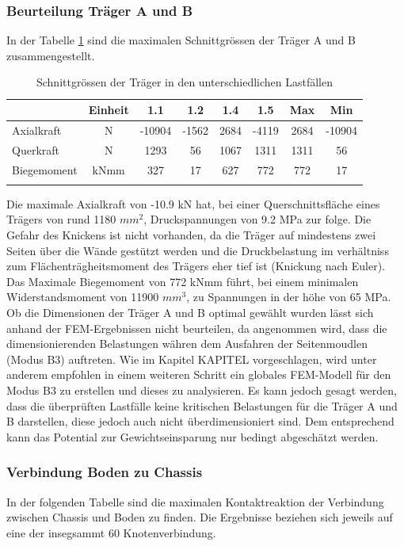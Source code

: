 \subsubsection{Beurteilung Träger A und B}
In der Tabelle \ref{tab:FEMres Träger} sind die maximalen Schnittgrössen der Träger A und B zusammengestellt.
\begin{table}[H]
\centering
\begin{tabular}{lccccccc}
\thickhline
&	Einheit	&	1.1	&	1.2	&	1.4	&	1.5	&	Max	&	Min	\\	\hline
Axialkraft	&	N	&	-10904	&	-1562	&	2684	&	-4119	&	2684	&	-10904	\\
Querkraft	&	N	&	1293	&	56	&	1067	&	1311	&	1311	&	56	\\
Biegemoment	&	kNmm	&	327	&	17	&	627	&	772	&	772	&	17	\\	\thickhline
\end{tabular}
\caption{Schnittgrössen der Träger in den unterschiedlichen Lastfällen}
\label{tab:FEMres Träger}
\end{table}

Die maximale Axialkraft von -10.9 kN hat, bei einer Querschnittsfläche eines Trägers von rund 1180 $mm^2$, Druckspannungen von 9.2 MPa zur folge. Die Gefahr des Knickens ist nicht vorhanden, da die Träger auf mindestens zwei Seiten über die Wände gestützt werden und die Druckbelastung im verhältniss zum Flächenträgheitsmoment des Trägers eher tief ist (Knickung nach Euler). Das Maximale Biegemoment von 772 kNmm führt, bei einem minimalen Widerstandsmoment von 11900 $mm^3$, zu Spannungen in der höhe von 65 MPa.\\
Ob die Dimensionen der Träger A und B optimal gewählt wurden lässt sich anhand der FEM-Ergebnissen nicht beurteilen, da angenommen wird, dass die dimensionierenden Belastungen währen dem Ausfahren der Seitenmoudlen (Modus B3) auftreten. Wie im Kapitel KAPITEL vorgeschlagen, wird unter anderem empfohlen in einem weiteren Schritt ein globales FEM-Modell für den Modus B3 zu erstellen und dieses zu analysieren. Es kann jedoch gesagt werden, dass die überprüften Lastfälle keine kritischen Belastungen für die Träger A und B darstellen, diese jedoch auch nicht überdimensioniert sind. Dem entsprechend kann das Potential zur Gewichtseinsparung nur bedingt abgeschätzt werden.

\subsubsection{Verbindung Boden zu Chassis}
In der folgenden Tabelle sind die maximalen Kontaktreaktion der Verbindung zwischen Chassis und Boden zu finden. Die Ergebnisse beziehen sich jeweils auf eine der insegsammt 60 Knotenverbindung.

